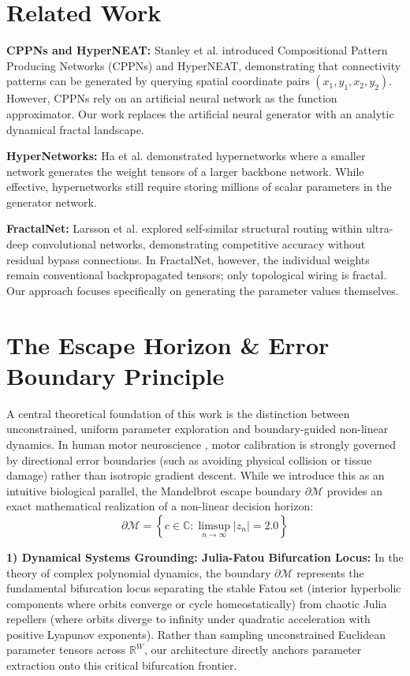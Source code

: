 \documentclass[10pt,journal,compsoc,twocolumn]{article}
\begin{document}
\section{Related Work}
\textbf{CPPNs and HyperNEAT:} Stanley et al. \cite{stanley2009hyperneat} introduced Compositional Pattern Producing Networks (CPPNs) and HyperNEAT, demonstrating that connectivity patterns can be generated by querying spatial coordinate pairs $(x_1, y_1, x_2, y_2)$. However, CPPNs rely on an artificial neural network as the function approximator. Our work replaces the artificial neural generator with an analytic dynamical fractal landscape.

\textbf{HyperNetworks:} Ha et al. \cite{ha2016hypernetworks} demonstrated hypernetworks where a smaller network generates the weight tensors of a larger backbone network. While effective, hypernetworks still require storing millions of scalar parameters in the generator network.

\textbf{FractalNet:} Larsson et al. \cite{larsson2016fractalnet} explored self-similar structural routing within ultra-deep convolutional networks, demonstrating competitive accuracy without residual bypass connections. In FractalNet, however, the individual weights remain conventional backpropagated tensors; only topological wiring is fractal. Our approach focuses specifically on generating the parameter values themselves.

\section{The Escape Horizon \& Error Boundary Principle}
A central theoretical foundation of this work is the distinction between unconstrained, uniform parameter exploration and boundary-guided non-linear dynamics. In human motor neuroscience \cite{shadmehr2010error}, motor calibration is strongly governed by directional error boundaries (such as avoiding physical collision or tissue damage) rather than isotropic gradient descent. While we introduce this as an intuitive biological parallel, the Mandelbrot escape boundary $\partial \mathcal{M}$ provides an exact mathematical realization of a non-linear decision horizon:
\begin{equation}
\partial \mathcal{M} = \left\{ c \in \mathbb{C} : \limsup_{n \to \infty} |z_n| = 2.0 \right\}
\end{equation}

\textbf{1) Dynamical Systems Grounding: Julia-Fatou Bifurcation Locus:} In the theory of complex polynomial dynamics, the boundary $\partial \mathcal{M}$ represents the fundamental bifurcation locus separating the stable Fatou set (interior hyperbolic components where orbits converge or cycle homeostatically) from chaotic Julia repellers (where orbits diverge to infinity under quadratic acceleration with positive Lyapunov exponents). Rather than sampling unconstrained Euclidean parameter tensors across $\mathbb{R}^W$, our architecture directly anchors parameter extraction onto this critical bifurcation frontier.
\end{document}
